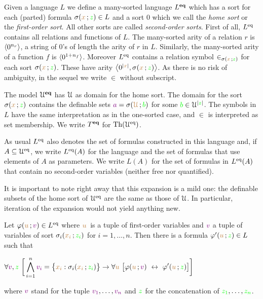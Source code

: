 \documentclass[creche.tex]{subfiles}
\begin{document}
Given a language $L$ we define a many-sorted language \emph{$L^{\rm\textbf{eq}}$\/} which has a sort for each (parted) formula $\sigma({\color{brown} x}\,;{\color{green} z})\in L$ and a sort \emph{$0$\/} which we call the \emph{home sort\/} or the \emph{first-order sort}. All other sorts are called \emph{second-order sorts}. First of all, $L^{{\rm eq}}$ contains all relations and functions of $L$. The many-sorted arity of a relation $r$ is $\langle0^{n_r}\rangle$, a string of $0$'s of length the arity of $r$ in $L$.  Similarly, the many-sorted arity of a function $f$ is $\langle0^{1+n_f}\rangle$. Moreover $L^{{\rm eq}}$ contains a relation symbol $\in_{\sigma({\color{brown} x}\,;{\color{green} z})}$ for each sort $\sigma({\color{brown} x}\,;{\color{green} z})$. These have arity $\big\langle0^{|{\color{brown} x}|},\sigma({\color{brown} x}\,;{\color{green} z})\big\rangle$. As there is no risk of ambiguity, in the sequel we write $\in$ without subscript.

The model \emph{$\EuScript U^{\rm\textbf{eq}}$\/} has $\EuScript U$ as domain for the home sort. The domain for the sort $\sigma({\color{brown} x}\,;{\color{green} z})$ contains the definable sets ${\color{violet} a}=\sigma({\color{brown}\EuScript U}\,;{\color{green} b})$ for some ${\color{green} b}\in\EuScript U^{|{\color{green} z}|}$. The symbols in $L$ have the same interpretation as in the one-sorted case, and $\in$ is interpreted as set membership. We write \emph{$T^{\rm\textbf{eq}}$\/} for $\textrm{Th}(\EuScript U^{{\rm eq}})$.

As usual \emph{$L^{{\rm eq}}$\/} also denotes the set of formulas constructed in this language and, if $A\subseteq\EuScript U^{{\rm eq}}$, we write  \emph{$L^{{\rm eq}}(A)$\/} for the language and the set of formulas that use elements of $A$ as parameters. We write \emph{$L(A)$\/} for the set of formulas in $L^{{\rm eq}}(A)$ that contain no second-order variables (neither free nor quantified).  



It is important to note right away that this expansion is a mild one: the definable subsets of the home sort of $\EuScript U^{{\rm eq}}$ are the same as those of $\EuScript U$. In particular, iteration of the expansion would not yield anything new. 



\begin{proposition}\label{prop_eqmild}
Let $\varphi({\color{brown} u}\,;{\color{violet} v})\in L^{{\rm eq}}$ where ${\color{brown} u}\,$ is a tuple of first-order variables and  ${\color{violet} v}$ a tuple of variables of sort $\sigma_i({\color{brown} x_i}\,;{\color{green} z_i})$ for $i=1,\dots,n$. Then there is a formula $\varphi'({\color{brown} u}\,;{\color{green} z})\in L$ such that 

\hfil$\displaystyle\A {\vl v},{\gr z}\ \bigg[\bigwedge^n_{i=1}{\vl v_i}=\big\{{\mr x_i}:\sigma_i({\mr x_i}\,;{\gr z_i})\big\}\imp\A {\mr u}\ \big[\phi({\mr u}\,;{\vl v})\ \iff\ \phi'({\mr u}\,;{\gr z})\big]\bigg]$

where ${\color{violet} v}$ stand for the tuple ${\color{violet} v_1},\dots,{\color{violet} v_n}$ and ${\color{green} z}$ for the concatenation of ${\color{green} z_1},\dots,{\color{green} z_n}$.%
\end{proposition}
\end{document}
